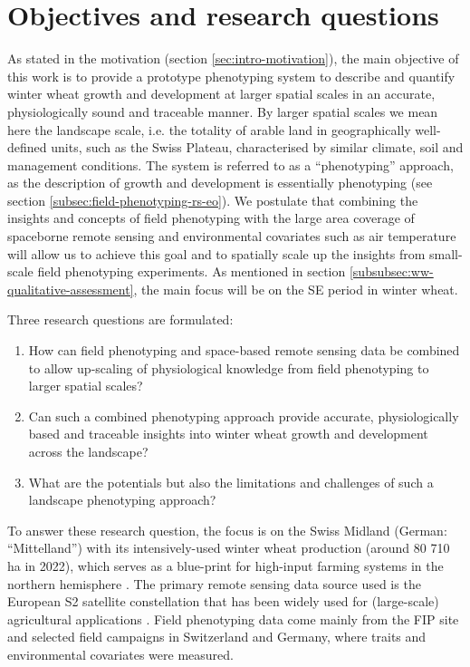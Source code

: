 \section{Objectives and research questions}
\label{sec:intro-obj-rj}
As stated in the motivation (section \ref{sec:intro-motivation}), the main objective of this work is to provide a prototype phenotyping system to describe and quantify winter wheat growth and development at larger spatial scales in an accurate, physiologically sound and traceable manner. By larger spatial scales we mean here the landscape scale, i.e. the totality of arable land in geographically well-defined units, such as the Swiss Plateau, characterised by similar climate, soil and management conditions. The system is referred to as a ``phenotyping'' approach, as the description of growth and development is essentially phenotyping (see section \ref{subsec:field-phenotyping-rs-eo}). We postulate that combining the insights and concepts of field phenotyping with the large area coverage of spaceborne remote sensing and environmental covariates such as air temperature will allow us to achieve this goal and to spatially scale up the insights from small-scale field phenotyping experiments. As mentioned in section \ref{subsubsec:ww-qualitative-assessment}, the main focus will be on the \gls{SE} period in winter wheat.

Three research questions are formulated:

\begin{enumerate}
    \item How can field phenotyping and space-based remote sensing data be combined to allow up-scaling of physiological knowledge from field phenotyping to larger spatial scales?
    \item Can such a combined phenotyping approach provide accurate, physiologically based and traceable insights into winter wheat growth and development across the landscape?
    \item What are the potentials but also the limitations and challenges of such a landscape phenotyping approach?
\end{enumerate}

To answer these research question, the focus is on the Swiss Midland (German: ``Mittelland'') with its intensively-used winter wheat production (around 80 710 ha in 2022), which serves as a blue-print for high-input farming systems in the northern hemisphere \citep{monfreda_farming_2008}. The primary remote sensing data source used is the European \gls{S2} satellite constellation that has been widely used for (large-scale) agricultural applications \citep{frampton_evaluating_2013,  veloso_understanding_2017, clevers_using_2017, perich_pixel-based_2022}. Field phenotyping data come mainly from the FIP site \citep{kirchgessner_eth_2017} and selected field campaigns in Switzerland and Germany, where traits and environmental covariates were measured.

